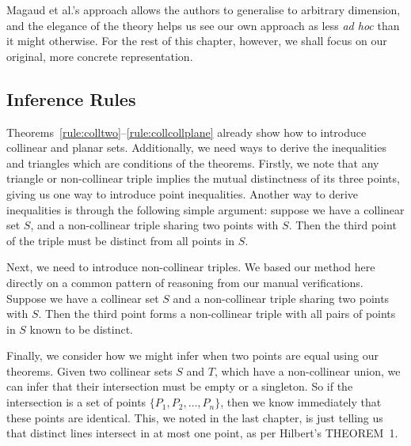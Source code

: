 Magaud et al.'s approach allows the authors to generalise to arbitrary dimension, and the elegance of the theory helps us see our own approach as less \emph{ad hoc} than it might otherwise. For the rest of this chapter, however, we shall focus on our original, more concrete representation.

\subsection{Inference Rules}\label{list:Procedures}
Theorems~\ref{rule:colltwo}--\ref{rule:collcollplane} already show how to introduce collinear and planar sets. Additionally, we need ways to derive the inequalities and triangles which are conditions of the theorems. Firstly, we note that any triangle or non-collinear triple implies the mutual distinctness of its three points, giving us one way to introduce point inequalities. Another way to derive inequalities is through the following simple argument: suppose we have a collinear set $S$, and a non-collinear triple sharing two points with $S$. Then the third point of the triple must be distinct from all points in $S$. 

Next, we need to introduce non-collinear triples. We based our method here directly on a common pattern of reasoning from our manual verifications. Suppose we have a collinear set $S$ and a non-collinear triple sharing two points with $S$. Then the third point forms a non-collinear triple with all pairs of points in $S$ known to be distinct.

Finally, we consider how we might infer when two points are equal using our theorems. Given two collinear sets $S$ and $T$, which have a non-collinear union, we can infer that their intersection must be empty or a singleton. So if the intersection is a set of points $\{P_1,P_2,\ldots,P_n\}$, then we know immediately that these points are identical. This, we noted in the last chapter, is just telling us that distinct lines intersect in at most one point, as per Hilbert's THEOREM~1.

